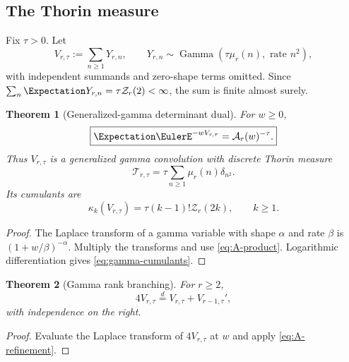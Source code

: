 \documentclass[11pt,oneside]{article}
\newtheorem{theorem}{Theorem}[section]
\theoremstyle{definition}
\theoremstyle{remark}
\newcommand{\ZetaR}{\mathcal Z}
\newcommand{\Ar}{\mathcal A}
\begin{document}
\subsection{The Thorin measure}

Fix $\tau>0$.  Let
\begin{equation}\label{eq:V-def}
 V_{r,\tau}:=\sum_{n\geq1}Y_{r,n},
 \qquad
 Y_{r,n}\sim\operatorname{Gamma}(\tau\mu_r(n),\text{ rate }n^2),
\end{equation}
with independent summands and zero-shape terms omitted.  Since
$\sum_n\Expectation Y_{r,n}=\tau\ZetaR_r(2)<\infty$, the sum is finite almost surely.

\begin{theorem}[Generalized-gamma determinant dual]\label{thm:gamma-dual}
For $w\geq0$,
\begin{equation}\label{eq:gamma-LT}
 \boxed{
 \Expectation\EulerE^{-wV_{r,\tau}}=\Ar_r(w)^{-\tau}.}
\end{equation}
Thus $V_{r,\tau}$ is a generalized gamma convolution with discrete Thorin
measure
\begin{equation}\label{eq:Thorin}
 \mathcal T_{r,\tau}=\tau\sum_{n\geq1}\mu_r(n)\delta_{n^2}.
\end{equation}
Its cumulants are
\begin{equation}\label{eq:gamma-cumulants}
 \kappa_k(V_{r,\tau})=\tau(k-1)!\ZetaR_r(2k),\qquad k\geq1.
\end{equation}
\end{theorem}

\begin{proof}
The Laplace transform of a gamma variable with shape $\alpha$ and rate
$\beta$ is $(1+w/\beta)^{-\alpha}$.  Multiply the transforms and use
\eqref{eq:A-product}.  Logarithmic differentiation gives
\eqref{eq:gamma-cumulants}.
\end{proof}

\begin{theorem}[Gamma rank branching]\label{thm:V-branching}
For $r\geq2$,
\begin{equation}\label{eq:V-branching}
 4V_{r,\tau}\stackrel d=V_{r,\tau}+V_{r-1,\tau}',
\end{equation}
with independence on the right.
\end{theorem}

\begin{proof}
Evaluate the Laplace transform of $4V_{r,\tau}$ at $w$ and apply
\eqref{eq:A-refinement}.
\end{proof}
\end{document}
